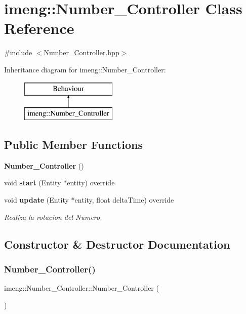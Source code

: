 \section{imeng\+::Number\+\_\+\+Controller Class Reference}
\label{classimeng_1_1_number___controller}


{\ttfamily \#include $<$Number\+\_\+\+Controller.\+hpp$>$}

Inheritance diagram for imeng\+::Number\+\_\+\+Controller\+:\begin{figure}[H]
\begin{center}
\leavevmode
\includegraphics[height=2.000000cm]{classimeng_1_1_number___controller}
\end{center}
\end{figure}
\subsection*{Public Member Functions}
\begin{DoxyCompactItemize}
\item 
\textbf{ Number\+\_\+\+Controller} ()
\item 
void \textbf{ start} (Entity $\ast$entity) override
\item 
void \textbf{ update} (Entity $\ast$entity, float delta\+Time) override
\begin{DoxyCompactList}\small\item\em Realiza la rotacion del Numero. \end{DoxyCompactList}\end{DoxyCompactItemize}


\subsection{Constructor \& Destructor Documentation}
\mbox{\label{classimeng_1_1_number___controller_a3fa2174fb8cf0cf541ded1dfd0db3e88}} 
\subsubsection{Number\_Controller()}
{\footnotesize\ttfamily imeng\+::\+Number\+\_\+\+Controller\+::\+Number\+\_\+\+Controller (\begin{DoxyParamCaption}{ }\end{DoxyParamCaption})}



